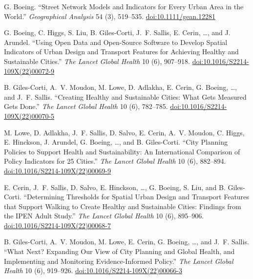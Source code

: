 \documentclass[11pt,letterpaper]{report} %
\begin{document}
\begin{tablist}
\item[2022] \tab{}G. Boeing. \enquote{Street Network Models and Indicators for Every Urban Area in the World.} \textit{Geographical Analysis} 54 (3), 519--535. \href{https://doi.org/10.1111/gean.12281}{doi:10.1111/gean.12281}

\item[2022] \tab{}G. Boeing, C. Higgs, S. Liu, B. Giles-Corti, J.~F. Sallis, E. Cerin, \ldots, and J. Arundel. \enquote{Using Open Data and Open-Source Software to Develop Spatial Indicators of Urban Design and Transport Features for Achieving Healthy and Sustainable Cities.} \textit{The Lancet Global Health} 10 (6), 907--918. \href{https://doi.org/10.1016/S2214-109X(22)00072-9}{doi:10.1016/S2214-109X(22)00072-9}

\item[2022] \tab{}B. Giles-Corti, A.~V. Moudon, M. Lowe, D. Adlakha, E. Cerin, G. Boeing, \ldots, and J.~F. Sallis. \enquote{Creating Healthy and Sustainable Cities: What Gets Measured Gets Done.} \textit{The Lancet Global Health} 10 (6), 782--785. \href{https://doi.org/10.1016/S2214-109X(22)00070-5}{doi:10.1016/S2214-109X(22)00070-5}

\item[2022] \tab{}M. Lowe, D. Adlakha, J.~F. Sallis, D. Salvo, E. Cerin, A.~V. Moudon, C. Higgs, E. Hinckson, J. Arundel, G. Boeing, \ldots, and B. Giles-Corti. \enquote{City Planning Policies to Support Health and Sustainability: An International Comparison of Policy Indicators for 25 Cities.} \textit{The Lancet Global Health} 10 (6), 882--894. \href{https://doi.org/10.1016/S2214-109X(22)00069-9}{doi:10.1016/S2214-109X(22)00069-9}

\item[2022] \tab{}E. Cerin, J.~F. Sallis, D. Salvo, E. Hinckson, \ldots, G. Boeing, S. Liu, and B. Giles-Corti. \enquote{Determining Thresholds for Spatial Urban Design and Transport Features that Support Walking to Create Healthy and Sustainable Cities: Findings from the IPEN Adult Study.} \textit{The Lancet Global Health} 10 (6), 895--906. \href{https://doi.org/10.1016/S2214-109X(22)00068-7}{doi:10.1016/S2214-109X(22)00068-7}

\item[2022] \tab{}B. Giles-Corti, A.~V. Moudon, M. Lowe, E. Cerin, G. Boeing, \ldots, and J.~F. Sallis. \enquote{What Next? Expanding Our View of City Planning and Global Health, and Implementing and Monitoring Evidence-Informed Policy.} \textit{The Lancet Global Health} 10 (6), 919--926. \href{https://doi.org/10.1016/S2214-109X(22)00066-3}{doi:10.1016/S2214-109X(22)00066-3}


\end{tablist}
\end{document}
